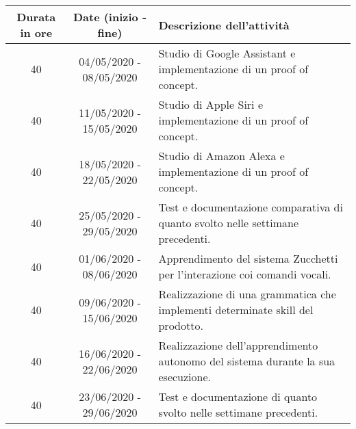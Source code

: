 

\begin{tabularx}{\textwidth}{|c|c|X|}
	\hline
	\textbf{Durata in ore} & \textbf{Date (inizio - fine)} & \textbf{Descrizione dell'attività} \\\hline
	
	40 & 04/05/2020 - 08/05/2020 & Studio di Google Assistant e implementazione di un proof of concept. \\
	\hline
    40 & 11/05/2020 - 15/05/2020 & Studio di Apple Siri e implementazione di un proof of concept. \\
    \hline
    40 & 18/05/2020 - 22/05/2020 & Studio di Amazon Alexa e implementazione di un proof of concept. \\
    \hline
    40 & 25/05/2020 - 29/05/2020 & Test e documentazione comparativa di quanto svolto nelle settimane precedenti. \\
    \hline
    40 & 01/06/2020 - 08/06/2020 & Apprendimento del sistema Zucchetti per l'interazione coi comandi vocali. \\
    \hline
    40 & 09/06/2020 - 15/06/2020 & Realizzazione di una grammatica che implementi determinate skill del prodotto. \\
    \hline
    40 & 16/06/2020 - 22/06/2020 & Realizzazione dell'apprendimento autonomo del sistema durante la sua esecuzione. \\
    \hline
    40 & 23/06/2020 - 29/06/2020 & Test e documentazione di quanto svolto nelle settimane precedenti. \\	
    \hline
\end{tabularx}